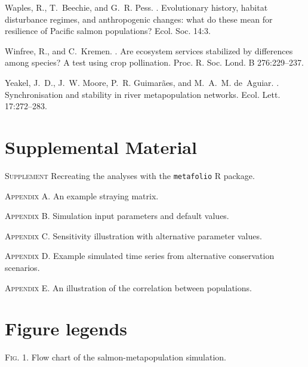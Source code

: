 \documentclass[12pt,english]{article}
\begin{document}
\begin{spacing}{1.9}
\begin{thebibliography}{64}
Waples, R., T.~Beechie, and G.~R. Pess.
.
\newblock Evolutionary history, habitat disturbance regimes, and anthropogenic
  changes: what do these mean for resilience of {Pacific} salmon populations?
\newblock Ecol. Soc. 14:3.

Winfree, R., and C.~Kremen.
.
\newblock Are ecosystem services stabilized by differences among species? {A}
  test using crop pollination.
\newblock Proc. R. Soc. Lond. B 276:229--237.

Yeakel, J.~D., J.~W. Moore, P.~R. Guimar{\~a}es, and M.~A.~M. de~Aguiar.
.
\newblock Synchronisation and stability in river metapopulation networks.
\newblock Ecol. Lett. 17:272--283.

\end{thebibliography}

\clearpage

\section{Supplemental Material}

\noindent
\textsc{Supplement} Recreating the analyses with the \texttt{metafolio} \textsf{R} package.

\noindent
\textsc{Appendix A.} An example straying matrix.

\noindent
\textsc{Appendix B.} Simulation input parameters and default values.

\noindent
\textsc{Appendix C.} Sensitivity illustration with alternative parameter values.

\noindent
\textsc{Appendix D.} Example simulated time series from alternative conservation scenarios.

\noindent
\textsc{Appendix E.} An illustration of the correlation between populations.

\clearpage

\section{Figure legends}

\textsc{Fig. 1}. Flow chart of the salmon-metapopulation simulation.



\end{spacing}
\end{document}
